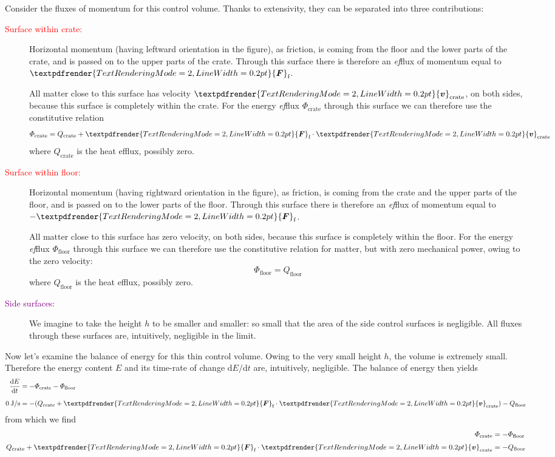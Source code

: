 \documentclass[a4paper,12pt,%
onecolumn,oneside,%
british%
]{memoir}
\renewcommand*{\bm}[1]{\textpdfrender{TextRenderingMode=2,LineWidth=0.2pt}{\boldsymbol{#1}}}
\newcommand*{\di}{\mathrm{d}}%
\renewcommand*{\|}[1][]{\nonscript\:#1\vert\nonscript\:\mathopen{}}
\newcommand*{\yv}{\bm{v}}
\newcommand*{\yvc}{\yv_{\textrm{crate}}}
\newcommand*{\dt}{\di t}
\newcommand*{\yE}{E}
\newcommand*{\yH}{\varPhi}%
\newcommand*{\yHfl}{\yH_{\textrm{floor}}}
\newcommand*{\yHc}{\yH_{\textrm{crate}}}
\newcommand*{\yQ}{Q}%
\newcommand*{\yQc}{\yQ_{\textrm{crate}}}
\newcommand*{\yQfl}{\yQ_{\textrm{floor}}}
\newcommand*{\yF}{\bm{F}}
\newcommand*{\yFf}{\yF_{\textrm{f}}}
\begin{document}
Consider the fluxes of momentum for this control volume. Thanks to extensivity, they can be separated into three contributions:
\begin{description}
\item[\textcolor{red}{Surface within crate:}] Horizontal momentum (having leftward orientation in the figure), as friction, is coming from the floor and the lower parts of the crate, and is passed on to the upper parts of the crate. Through this surface there is therefore an \emph{ef}flux of momentum equal to $\yFf$.

All matter close to this surface has velocity $\yvc$, on both sides, because this surface is completely within the crate. For the energy \emph{ef}flux  $\yHc$ through this surface we can therefore use the constitutive relation
\begin{equation*}
  \yHc = \yQc +\yFf\cdot \yvc
\end{equation*}
where $\yQc$ is the heat efflux, possibly zero.

\item[\textcolor{red}{Surface within floor:}] Horizontal momentum (having rightward orientation in the figure), as friction, is coming from the crate and the upper parts of the floor, and is passed on to the lower parts of the floor. Through this surface there is therefore an \emph{ef}flux of momentum equal to $-\yFf$.

  All matter close to this surface has zero velocity, on both sides, because this surface is completely within the floor. For the energy \emph{ef}flux $\yHfl$ through this surface we can therefore use the constitutive relation for matter, but with zero mechanical power, owing to the zero velocity:
\begin{equation*}
  \yHfl = \yQfl
\end{equation*}
where $\yQfl$ is the heat efflux, possibly zero.

\item[\textcolor{purple}{Side surfaces:}] We imagine to take the height $h$ to be smaller and smaller: so small that the area of the side control surfaces is negligible. All fluxes through these surfaces are, intuitively, negligible in the limit.
\end{description}

Now let's examine the balance of energy for this thin control volume. Owing to the very small height $h$, the volume is extremely small. Therefore the energy content $\yE$ and its time-rate of change $\di\yE/\dt$ are, intuitively, negligible. The balance of energy then yields
\begin{equation*}
  \begin{aligned}
    \frac{\di\yE}{\dt} &= -\yHc -\yHfl
    \\[2\jot]
    \qty{0}{J/s}&= - (\yQc + \yFf\cdot \yvc) - \yQfl
  \end{aligned}
\end{equation*}
from which we find
\begin{equation*}
  \begin{aligned}
    \yHc &= -\yHfl \\[\jot]  \yQc + \yFf \cdot \yvc &= -\yQfl
  \end{aligned}
\end{equation*}
\end{document}
